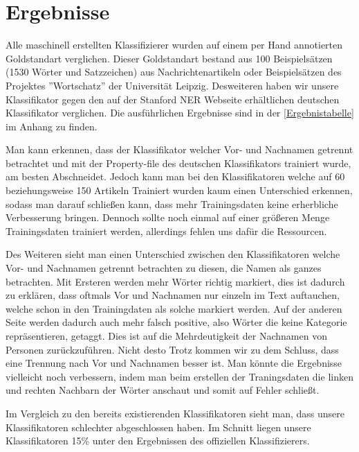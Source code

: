 \documentclass[a4paper]{article}
\begin{document}
\section{Ergebnisse}
	Alle maschinell erstellten Klassifizierer wurden auf einem per Hand annotierten Goldstandart verglichen. 
	Dieser Goldstandart bestand aus 100 Beispielsätzen (1530 Wörter und Satzzeichen) aus Nachrichtenartikeln oder Beispielsätzen des Projektes ''Wortschatz'' der Universität Leipzig. 
	Desweiteren haben wir unsere Klassifikator gegen den auf der Stanford NER Webseite erhältlichen deutschen Klassifikator  verglichen. 
	Die ausführlichen Ergebnisse sind in der \autoref{Ergebnistabelle} im Anhang zu finden.
	
	Man kann erkennen, dass der Klassifikator welcher Vor- und Nachnamen getrennt betrachtet und mit der Property-file des deutschen Klassifikators trainiert wurde, am besten Abschneidet. 
	Jedoch kann man bei den Klassifikatoren welche auf 60 beziehungsweise 150 Artikeln Trainiert wurden kaum einen Unterschied erkennen, sodass man darauf schließen kann, dass mehr Trainingsdaten keine erherbliche Verbesserung bringen. 
	Dennoch sollte noch einmal auf einer größeren Menge Trainingsdaten trainiert werden, allerdings fehlen uns dafür die Ressourcen.  
	
	Des Weiteren sieht man einen Unterschied zwischen den Klassifikatoren welche Vor- und Nachnamen getrennt betrachten zu diesen, die Namen als ganzes betrachten. 
	Mit Ersteren werden mehr Wörter richtig markiert, dies ist dadurch zu erklären, dass oftmals Vor und Nachnamen nur einzeln im Text auftauchen, welche schon in den Trainingdaten als solche markiert werden. 
	Auf der anderen Seite werden dadurch auch mehr falsch positive, also Wörter die keine Kategorie repräsentieren, getaggt. 
	Dies ist auf die Mehrdeutigkeit der Nachnamen von Personen zurückzuführen. 
	Nicht desto Trotz kommen wir zu dem Schluss, dass eine Trennung nach Vor und Nachnamen besser ist. 
	Man könnte die Ergebnisse vielleicht noch verbessern, indem man beim erstellen der Traningsdaten die linken und rechten Nachbarn der Wörter anschaut und somit auf Fehler schließt. 
	
	Im Vergleich zu den bereits existierenden Klassifikatoren sieht man, dass unsere Klassifikatoren schlechter abgeschlossen haben. 
	Im Schnitt liegen unsere Klassifikatoren 15\% unter den Ergebnissen des offiziellen Klassifizierers.
	
\end{document}

